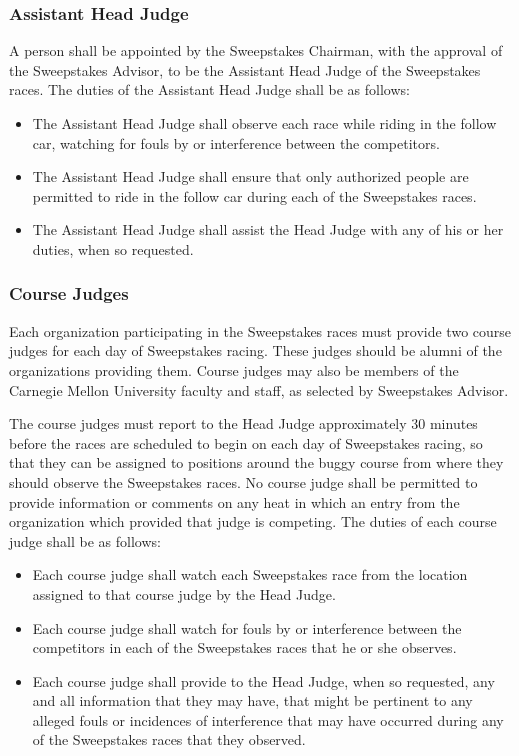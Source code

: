 \documentclass[openany]{book}
\begin{document}
\subsubsection{Assistant Head Judge}

A person shall be appointed by the Sweepstakes Chairman, with the approval of the Sweepstakes Advisor, to be the Assistant Head Judge of the Sweepstakes races. The duties of the Assistant Head Judge shall be as follows:
\begin{itemize}
	\item The Assistant Head Judge shall observe each race while riding in the follow car, watching for fouls by or interference between the competitors.
	\item The Assistant Head Judge shall ensure that only authorized people are permitted to ride in the follow car during each of the Sweepstakes races.
	\item The Assistant Head Judge shall assist the Head Judge with any of his or her duties, when so requested.
\end{itemize}

\subsubsection{Course Judges}

Each organization participating in the Sweepstakes races must provide two course judges for each day of Sweepstakes racing. These judges should be alumni of the organizations providing them. Course judges may also be members of the Carnegie Mellon University faculty and staff, as selected by Sweepstakes Advisor.

The course judges must report to the Head Judge approximately 30 minutes before the races are scheduled to begin on each day of Sweepstakes racing, so that they can be assigned to positions around the buggy course from where they should observe the Sweepstakes races. No course judge shall be permitted to provide information or comments on any heat in which an entry from the organization which provided that judge is competing. The duties of each course judge shall be as follows:
\begin{itemize}
	\item Each course judge shall watch each Sweepstakes race from the location assigned to that course judge by the Head Judge.
	\item Each course judge shall watch for fouls by or interference between the competitors in each of the Sweepstakes races that he or she observes.
	\item Each course judge shall provide to the Head Judge, when so requested, any and all information that they may have, that might be pertinent to any alleged fouls or incidences of interference that may have occurred during any of the Sweepstakes races that they observed.
\end{itemize}
\end{document}

